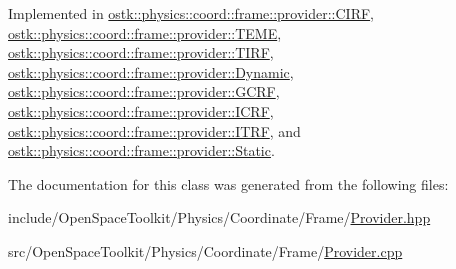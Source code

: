 Implemented in \hyperlink{classostk_1_1physics_1_1coord_1_1frame_1_1provider_1_1_c_i_r_f_affec3924a864a0d793ee5aa887a06cf8}{ostk\+::physics\+::coord\+::frame\+::provider\+::\+C\+I\+RF}, \hyperlink{classostk_1_1physics_1_1coord_1_1frame_1_1provider_1_1_t_e_m_e_a8a1c5599411f152c63b69819e89b0464}{ostk\+::physics\+::coord\+::frame\+::provider\+::\+T\+E\+ME}, \hyperlink{classostk_1_1physics_1_1coord_1_1frame_1_1provider_1_1_t_i_r_f_ac7f3d815a45e270adab07bf6f51dc25f}{ostk\+::physics\+::coord\+::frame\+::provider\+::\+T\+I\+RF}, \hyperlink{classostk_1_1physics_1_1coord_1_1frame_1_1provider_1_1_dynamic_ab01d8d9a09df8e46680eb1acb830a86c}{ostk\+::physics\+::coord\+::frame\+::provider\+::\+Dynamic}, \hyperlink{classostk_1_1physics_1_1coord_1_1frame_1_1provider_1_1_g_c_r_f_a02160b74124b3ece74912c62aae5caaa}{ostk\+::physics\+::coord\+::frame\+::provider\+::\+G\+C\+RF}, \hyperlink{classostk_1_1physics_1_1coord_1_1frame_1_1provider_1_1_i_c_r_f_a0d8e56478597e46dbc2c1867e6774398}{ostk\+::physics\+::coord\+::frame\+::provider\+::\+I\+C\+RF}, \hyperlink{classostk_1_1physics_1_1coord_1_1frame_1_1provider_1_1_i_t_r_f_a2f3a53b002d54f1adf829cefc2cf7393}{ostk\+::physics\+::coord\+::frame\+::provider\+::\+I\+T\+RF}, and \hyperlink{classostk_1_1physics_1_1coord_1_1frame_1_1provider_1_1_static_a5b7189d8cff8128fee348af2feac1304}{ostk\+::physics\+::coord\+::frame\+::provider\+::\+Static}.



The documentation for this class was generated from the following files\+:\begin{DoxyCompactItemize}
\item 
include/\+Open\+Space\+Toolkit/\+Physics/\+Coordinate/\+Frame/\hyperlink{_provider_8hpp}{Provider.\+hpp}\item 
src/\+Open\+Space\+Toolkit/\+Physics/\+Coordinate/\+Frame/\hyperlink{_provider_8cpp}{Provider.\+cpp}\end{DoxyCompactItemize}
